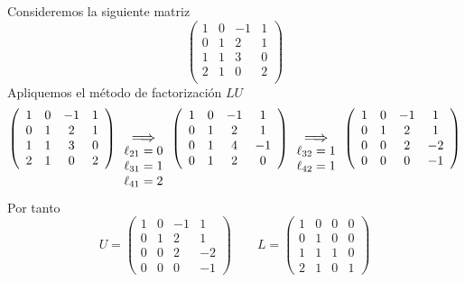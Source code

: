     \begin{ejem}
    Consideremos la siguiente matriz
     $$\begin{pmatrix}
              1&0&-1&1\\
              0&1&2 &1\\
              1&1&3&0\\
              2&1&0&2\\
              \end{pmatrix}$$
    Apliquemos el método de factorización $LU$
     $$\left(\begin{array}{cccc}
              1&0&-1&1\\
              0&1&2 &1\\
              1&1&3&0\\
              2&1&0&2
              \end{array}\right)
              \underset{\begin{array}{c}
                   \ell_{21}=0  \\
                   \ell_{31}=1 \\
                   \ell_{41}=2
              \end{array}}{\mathlarger{\Longrightarrow}}
              \left(\begin{array}{cccc}
              1&0&-1&1\\
              0&1&2 &1\\
              0&1&4&-1\\
              0&1&2&0
              \end{array}\right)
              \underset{\begin{array}{c}
                   \ell_{32}=1 \\
                   \ell_{42}=1
              \end{array}}{\mathlarger{\Longrightarrow}}
              \left(\begin{array}{cccc}
              1&0&-1&1\\
              0&1&2 &1\\
              0&0&2&-2\\
              0&0&0&-1
              \end{array}\right)
              $$
    Por tanto
    $$U=\left(\begin{array}{cccc}
              1&0&-1&1\\
              0&1&2 &1\\
              0&0&2&-2\\
              0&0&0&-1
              \end{array}\right)
              \qquad
     L=\left(\begin{array}{cccc}
              1&0&0&0\\
              0&1&0 &0\\
              1&1&1&0\\
              2&1&0&1
              \end{array}\right)  $$

    \end{ejem}
